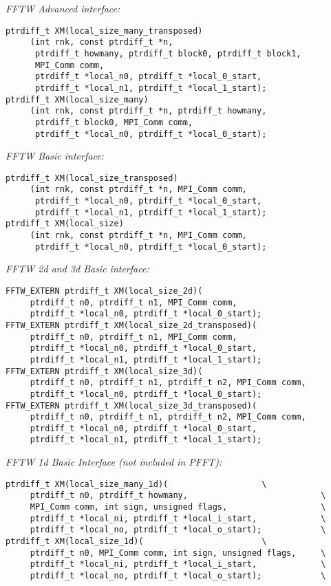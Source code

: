 \newpage
\emph{FFTW Advanced interface:}
\begin{verbatim}
ptrdiff_t XM(local_size_many_transposed)
     (int rnk, const ptrdiff_t *n,
      ptrdiff_t howmany, ptrdiff_t block0, ptrdiff_t block1,
      MPI_Comm comm,
      ptrdiff_t *local_n0, ptrdiff_t *local_0_start,
      ptrdiff_t *local_n1, ptrdiff_t *local_1_start);
ptrdiff_t XM(local_size_many)
     (int rnk, const ptrdiff_t *n, ptrdiff_t howmany,
      ptrdiff_t block0, MPI_Comm comm,
      ptrdiff_t *local_n0, ptrdiff_t *local_0_start);
\end{verbatim}
\emph{FFTW Basic interface:}
\begin{verbatim}
ptrdiff_t XM(local_size_transposed)
     (int rnk, const ptrdiff_t *n, MPI_Comm comm,
      ptrdiff_t *local_n0, ptrdiff_t *local_0_start,
      ptrdiff_t *local_n1, ptrdiff_t *local_1_start);
ptrdiff_t XM(local_size)
     (int rnk, const ptrdiff_t *n, MPI_Comm comm,
      ptrdiff_t *local_n0, ptrdiff_t *local_0_start);
\end{verbatim}
\emph{FFTW 2d and 3d Basic interface:}
\begin{verbatim}
FFTW_EXTERN ptrdiff_t XM(local_size_2d)(
     ptrdiff_t n0, ptrdiff_t n1, MPI_Comm comm,
     ptrdiff_t *local_n0, ptrdiff_t *local_0_start);
FFTW_EXTERN ptrdiff_t XM(local_size_2d_transposed)(
     ptrdiff_t n0, ptrdiff_t n1, MPI_Comm comm,
     ptrdiff_t *local_n0, ptrdiff_t *local_0_start,
     ptrdiff_t *local_n1, ptrdiff_t *local_1_start);
FFTW_EXTERN ptrdiff_t XM(local_size_3d)(
     ptrdiff_t n0, ptrdiff_t n1, ptrdiff_t n2, MPI_Comm comm,
     ptrdiff_t *local_n0, ptrdiff_t *local_0_start);
FFTW_EXTERN ptrdiff_t XM(local_size_3d_transposed)(
     ptrdiff_t n0, ptrdiff_t n1, ptrdiff_t n2, MPI_Comm comm,
     ptrdiff_t *local_n0, ptrdiff_t *local_0_start,
     ptrdiff_t *local_n1, ptrdiff_t *local_1_start);
\end{verbatim}
\emph{FFTW 1d Basic Interface (not included in PFFT):}
\begin{verbatim}
ptrdiff_t XM(local_size_many_1d)(                   \
     ptrdiff_t n0, ptrdiff_t howmany,                           \
     MPI_Comm comm, int sign, unsigned flags,                   \
     ptrdiff_t *local_ni, ptrdiff_t *local_i_start,             \
     ptrdiff_t *local_no, ptrdiff_t *local_o_start);            \
ptrdiff_t XM(local_size_1d)(                        \
     ptrdiff_t n0, MPI_Comm comm, int sign, unsigned flags,     \
     ptrdiff_t *local_ni, ptrdiff_t *local_i_start,             \
     ptrdiff_t *local_no, ptrdiff_t *local_o_start);            \
\end{verbatim}





